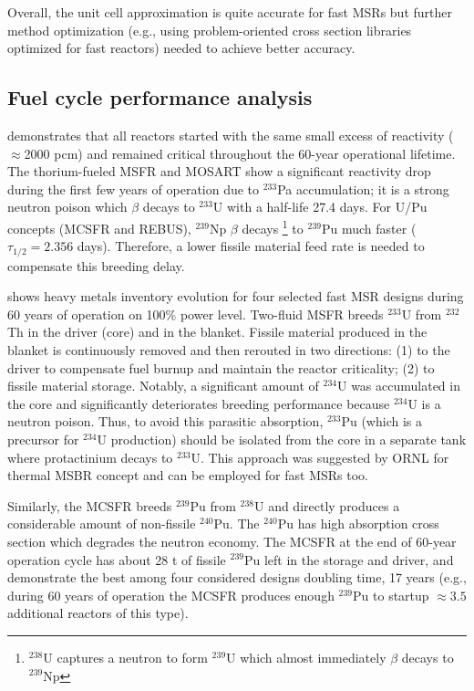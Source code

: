 \documentclass[letterpaper]{mandc2019}
\begin{document}
Overall, the unit cell approximation is quite accurate for fast \gls{MSR}s but further method optimization (e.g., using problem-oriented cross section libraries optimized for fast reactors) needed to achieve better accuracy.
\subsection{Fuel cycle performance analysis}
\label{sec:performance}
 demonstrates that all reactors started with the same small excess of reactivity ($\approx$2000 pcm) and remained critical throughout the 60-year operational lifetime. The thorium-fueled \gls{MSFR} and \gls{MOSART} show a significant reactivity drop during the first few years of operation due to $^{233}$Pa accumulation; it is a strong neutron poison which $\beta$ decays to $^{233}$U with a half-life 27.4 days. For U/Pu concepts (\gls{MCSFR} and REBUS), $^{239}$Np $\beta$ decays \footnote{$^{238}$U captures a neutron to form $^{239}$U which almost immediately $\beta$ decays to $^{239}$Np} to $^{239}$Pu much faster ($\tau_{1/2}=2.356$ days). Therefore, a lower fissile material feed rate is needed to compensate this breeding delay.

 shows heavy metals inventory evolution for four selected fast \gls{MSR} designs during 60 years of operation on 100\% power level. Two-fluid \gls{MSFR} breeds $^{233}$U from $^{232}$Th in the driver (core) and in the blanket. Fissile material produced in the blanket is continuously removed and then rerouted in two directions: (1) to the driver to compensate fuel burnup and maintain the reactor criticality; (2) to fissile material storage. Notably, a significant amount of $^{234}$U was accumulated in the core and significantly deteriorates breeding performance because $^{234}$U is a neutron poison. Thus, to avoid this parasitic absorption, $^{233}$Pu (which is a precursor for $^{234}$U production) should be isolated from the core in a separate tank where protactinium decays to $^{233}$U. This approach was suggested by \gls{ORNL} for thermal \gls{MSBR} concept \cite{robertson_conceptual_1971} and can be employed for fast \gls{MSR}s too.

Similarly, the \gls{MCSFR} breeds $^{239}$Pu from $^{238}$U and directly produces a considerable amount of non-fissile $^{240}$Pu. The $^{240}$Pu has high absorption cross section which degrades the neutron economy. The \gls{MCSFR} at the end of 60-year operation cycle has about 28 t of fissile $^{239}$Pu left in the storage and driver, and demonstrate the best among four considered designs doubling time, 17 years (e.g., during 60 years of operation the \gls{MCSFR} produces enough $^{239}$Pu to startup $\approx3.5$ additional reactors of this type).
\end{document}
